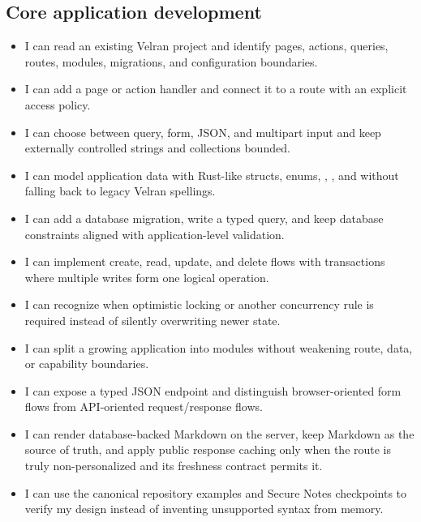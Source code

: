 \subsection*{Core application development}
\begin{itemize}[label={\texttt{[ ]}},leftmargin=2em]
  \item I can read an existing Velran project and identify pages, actions, queries, routes, modules, migrations, and configuration boundaries.
  \item I can add a page or action handler and connect it to a route with an explicit access policy.
  \item I can choose between query, form, JSON, and multipart input and keep externally controlled strings and collections bounded.
  \item I can model application data with Rust-like structs, enums, , , and  without falling back to legacy Velran spellings.
  \item I can add a database migration, write a typed query, and keep database constraints aligned with application-level validation.
  \item I can implement create, read, update, and delete flows with transactions where multiple writes form one logical operation.
  \item I can recognize when optimistic locking or another concurrency rule is required instead of silently overwriting newer state.
  \item I can split a growing application into modules without weakening route, data, or capability boundaries.
  \item I can expose a typed JSON endpoint and distinguish browser-oriented form flows from API-oriented request/response flows.
  \item I can render database-backed Markdown on the server, keep Markdown as the source of truth, and apply public response caching only when the route is truly non-personalized and its freshness contract permits it.
  \item I can use the canonical repository examples and Secure Notes checkpoints to verify my design instead of inventing unsupported syntax from memory.
\end{itemize}

